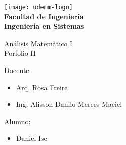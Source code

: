 \begin{titlepage}
	\begin{center}
		\vspace*{0.5cm}
		\texttt{[image: udemm-logo]}\\
		\vspace{0.2cm}
		\Large
		\textbf{Facultad de Ingeniería}\\
		\textbf{Ingeniería en Sistemas}\\
		\vspace{2cm}

		\Huge
		Análisis Matemático I\\
		Porfolio II
		\vfill

		\raggedright
		\Large
		Docente:
		\begin{itemize}
			\item[] Arq. Rosa Freire\\
			\item[] Ing. Alisson Danilo Merces Maciel\\
		\end{itemize}
		Alumno:
		\begin{itemize}
			\item[] Daniel Ise
		\end{itemize}
		\vspace{1cm}

	\end{center}
\end{titlepage}
